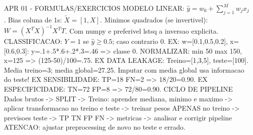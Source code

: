 APR 01 - FORMULAS/EXERCICIOS
MODELO LINEAR: $\hat y=w_0+\sum_{j=1}^{M}w_jx_j$.
Bias coluna de 1s: $\tilde X=[1,X]$.
Minimos quadrados (se invertivel):
$W=(X^TX)^{-1}X^TT$.
Com numpy e preferivel lstsq a inversao explicita.
CLASSIFICACAO: $Y=1$ se $\hat y\ge 0.5$; caso contrario 0.
EX: w=[0.1,0.5,0.2], x=[0.6,0.3]:
y=.1+.5*.6+.2*.3=.46 => classe 0.
NORMALIZAR: min 50 max 150, x=125 => (125-50)/100=.75.
EX DATA LEAKAGE:
Treino=[1,3,5], teste=[100].
Media treino=3; media global=27.25.
Imputar com media global usa informacao do teste!
EX SENSIBILIDADE:
TP=18 FN=2 => 18/20=0.90.
EX ESPECIFICIDADE:
TN=72 FP=8 => 72/80=0.90.
CICLO DE PIPELINE
Dados brutos
  -> SPLIT
  -> Treino: aprender mediana, minimo e maximo
  -> aplicar transformacao no treino e teste
  -> treinar pesos APENAS no treino
  -> previsoes teste
  -> TP TN FP FN -> metricas
  -> analisar e corrigir pipeline
ATENCAO: ajustar preprocessing de novo no teste e errado.